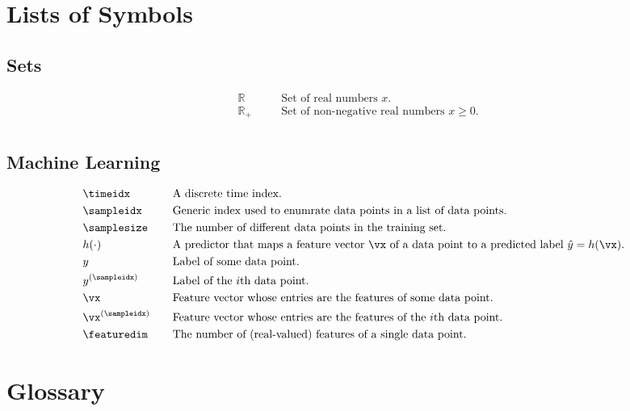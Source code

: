 \documentclass[12pt]{report}
\newcommand{\featurelen}{\featuredim}
\begin{document}
\chapter{Lists of Symbols}

\section{Sets} 
\begin{align} 
&\mathbb{R}  &\quad &\mbox{Set of real numbers $x$.} \nonumber \\
&\mathbb{R}_{+}  &\quad &\mbox{Set of non-negative real numbers $x\geq0$.} \nonumber \\ \nonumber
\end{align} 

\section{Machine Learning}
\begin{align} 
&\timeidx  &\quad &\mbox{A discrete time index.} \nonumber \\
&\sampleidx  &\quad &\mbox{Generic index used to enumrate data points in a list of data points. } \nonumber \\
&\samplesize  &\quad &\mbox{The number of different data points in the training set.} \nonumber \\ 
&h(\cdot)  &\quad &\mbox{A predictor that maps a feature vector $\vx$ of a data point to a predicted label $\hat{y}=h(\vx)$.} \nonumber \\ 
&y  &\quad &\mbox{Label of some data point.} \nonumber \\ 
&y^{(\sampleidx)}  &\quad &\mbox{Label of the $i$th data point.} \nonumber \\ 
&\vx  &\quad &\mbox{Feature vector whose entries are the features of some data point.} \nonumber \\ 
&\vx^{(\sampleidx)}  &\quad &\mbox{Feature vector whose entries are the features of the $i$th data point.} \nonumber \\ 
&\featurelen &\quad &\mbox{The number of (real-valued) features of a single data point.} \nonumber
\end{align} 


\chapter{Glossary} 
\end{document}
